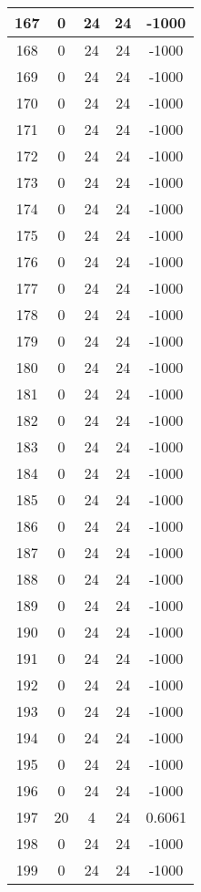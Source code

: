 \documentclass[letterpaper, 12pt]{article}
\begin{document}
\begin{longtable}{|c|c|c|c|c|}
\hline
167 & 0 & 24 & 24 & -1000 \\
\hline
168 & 0 & 24 & 24 & -1000 \\
\hline
169 & 0 & 24 & 24 & -1000 \\
\hline
170 & 0 & 24 & 24 & -1000 \\
\hline
171 & 0 & 24 & 24 & -1000 \\
\hline
172 & 0 & 24 & 24 & -1000 \\
\hline
173 & 0 & 24 & 24 & -1000 \\
\hline
174 & 0 & 24 & 24 & -1000 \\
\hline
175 & 0 & 24 & 24 & -1000 \\
\hline
176 & 0 & 24 & 24 & -1000 \\
\hline
177 & 0 & 24 & 24 & -1000 \\
\hline
178 & 0 & 24 & 24 & -1000 \\
\hline
179 & 0 & 24 & 24 & -1000 \\
\hline
180 & 0 & 24 & 24 & -1000 \\
\hline
181 & 0 & 24 & 24 & -1000 \\
\hline
182 & 0 & 24 & 24 & -1000 \\
\hline
183 & 0 & 24 & 24 & -1000 \\
\hline
184 & 0 & 24 & 24 & -1000 \\
\hline
185 & 0 & 24 & 24 & -1000 \\
\hline
186 & 0 & 24 & 24 & -1000 \\
\hline
187 & 0 & 24 & 24 & -1000 \\
\hline
188 & 0 & 24 & 24 & -1000 \\
\hline
189 & 0 & 24 & 24 & -1000 \\
\hline
190 & 0 & 24 & 24 & -1000 \\
\hline
191 & 0 & 24 & 24 & -1000 \\
\hline
192 & 0 & 24 & 24 & -1000 \\
\hline
193 & 0 & 24 & 24 & -1000 \\
\hline
194 & 0 & 24 & 24 & -1000 \\
\hline
195 & 0 & 24 & 24 & -1000 \\
\hline
196 & 0 & 24 & 24 & -1000 \\
\hline
197 & 20 & 4 & 24 & 0.6061 \\
\hline
198 & 0 & 24 & 24 & -1000 \\
\hline
199 & 0 & 24 & 24 & -1000 \\
\hline
\end{longtable}
\end{document}
